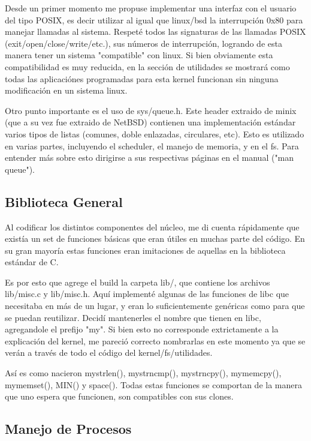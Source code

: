 Desde un primer momento me propuse implementar una interfaz con el usuario del
tipo POSIX, es decir utilizar al igual que linux/bsd la interrupción 0x80 para
manejar llamadas al sistema. Respeté todos las signaturas de las llamadas POSIX
(exit/open/close/write/etc.), sus números de interrupción, logrando de esta
manera tener un sistema "compatible" con linux. Si bien obviamente esta
compatibilidad es muy reducida, en la sección de utilidades se mostrará como
todas las aplicaciónes programadas para esta kernel funcionan sin ninguna
modificación en un sistema linux.

Otro punto importante es el uso de sys/queue.h. Este header extraido de minix
(que a su vez fue extraido de NetBSD) contienen una implementación estándar
varios tipos de listas (comunes, doble enlazadas, circulares, etc). Esto es
utilizado en varias partes, incluyendo el scheduler, el manejo de memoria, y en
el fs. Para entender más sobre esto dirigirse a sus respectivas páginas en el
manual ("man queue").

\subsection{Biblioteca General}

Al codificar los distintos componentes del núcleo, me di cuenta rápidamente que
existía un set de funciones básicas que eran útiles en muchas parte del código.
En su gran mayoría estas funciones eran imitaciones de aquellas en la
biblioteca estándar de C.

Es por esto que agrege el build la carpeta lib/, que contiene los archivos
lib/misc.c y lib/misc.h. Aquí implementé algunas de las funciones de libc que
necesitaba en más de un lugar, y eran lo suficientemente genéricas como para
que se puedan reutilizar. Decidí mantenerles el nombre que tienen en libc,
agregandole el prefijo "my". Si bien esto no corresponde extrictamente a la
explicación del kernel, me pareció correcto nombrarlas en este momento ya que
se verán a través de todo el código del kernel/fs/utilidades.

Así es como nacieron mystrlen(), mystrncmp(), mystrncpy(), mymemcpy(),
mymemset(), MIN() y space(). Todas estas funciones se comportan de la manera
que uno espera que funcionen, son compatibles con sus clones.

\subsection{Manejo de Procesos}


